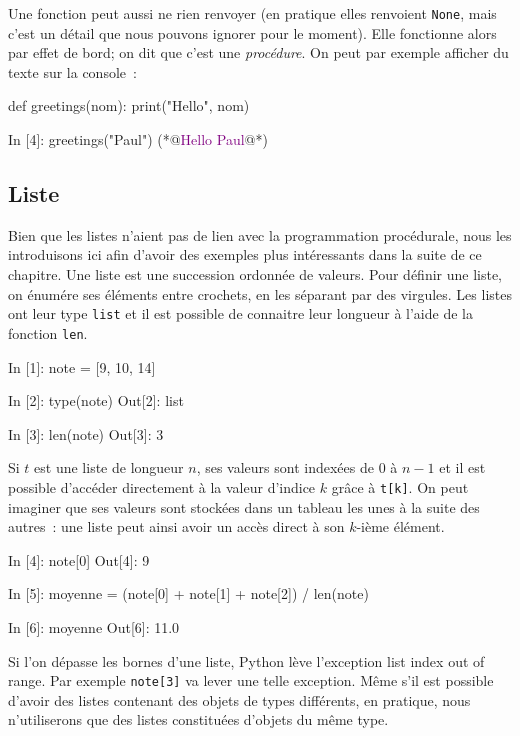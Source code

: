 \documentclass{magnolia}
\begin{document}
Une fonction peut aussi ne rien renvoyer (en pratique elles renvoient \verb!None!, mais c'est un détail que
nous pouvons ignorer pour le moment). Elle fonctionne alors par effet de bord; on dit que
c'est une \emph{procédure}. On peut par exemple afficher du texte sur la console~:

\begin{pythoncodeline}
def greetings(nom):
    print("Hello", nom)
\end{pythoncodeline}

\begin{pythoncode}
In [4]: greetings("Paul")
(*@\textcolor{purple}{Hello Paul}@*)
\end{pythoncode}



\subsection{Liste}

Bien que les listes n'aient pas de lien avec la programmation procédurale, nous les introduisons ici
afin d'avoir des exemples plus intéressants dans la suite de ce chapitre.
Une liste est une succession ordonnée de valeurs. Pour définir une liste, on
énumére ses éléments entre crochets, en les séparant par des virgules. Les listes ont leur type
\verb!list! et il est possible de connaitre leur longueur à l'aide de la fonction
\verb!len!.

\begin{pythoncode}
In [1]: note = [9, 10, 14]

In [2]: type(note)
Out[2]: list

In [3]: len(note)
Out[3]: 3
\end{pythoncode}

\noindent
Si $t$ est une liste de longueur $n$, ses valeurs sont indexées de 0 à $n-1$ et il
est possible d'accéder directement à la valeur d'indice $k$ grâce à \verb_t[k]_.
On peut imaginer que ses valeurs sont stockées dans un tableau les unes à la suite des
autres~: une liste peut ainsi avoir un accès direct à son $k$-ième élément.

\begin{pythoncode}
In [4]: note[0]
Out[4]: 9

In [5]: moyenne = (note[0] + note[1] + note[2]) / len(note)

In [6]: moyenne
Out[6]: 11.0
\end{pythoncode}

\noindent
Si l'on dépasse les bornes d'une liste, Python lève l'exception \og list index out of range\fg. Par exemple \verb_note[3]_ va lever une telle exception. Même s'il est possible d'avoir des listes contenant des objets de types
différents, en pratique, nous n'utiliserons que des listes constituées d'objets du même type.\\
\end{document}
